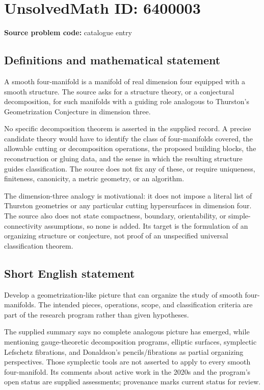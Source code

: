 \documentclass[11pt]{article}
\begin{document}
\section*{UnsolvedMath ID: 6400003}
\textbf{Source problem code:} catalogue entry
\subsection{Definitions and mathematical statement}
A smooth four-manifold is a manifold of real dimension four equipped with a smooth structure. The source asks for a structure theory, or a conjectural decomposition, for such manifolds with a guiding role analogous to Thurston's Geometrization Conjecture in dimension three.

No specific decomposition theorem is asserted in the supplied record. A precise candidate theory would have to identify the class of four-manifolds covered, the allowable cutting or decomposition operations, the proposed building blocks, the reconstruction or gluing data, and the sense in which the resulting structure guides classification. The source does not fix any of these, or require uniqueness, finiteness, canonicity, a metric geometry, or an algorithm.

The dimension-three analogy is motivational: it does not impose a literal list of Thurston geometries or any particular cutting hypersurfaces in dimension four. The source also does not state compactness, boundary, orientability, or simple-connectivity assumptions, so none is added. Its target is the formulation of an organizing structure or conjecture, not proof of an unspecified universal classification theorem.
\subsection{Short English statement}
Develop a geometrization-like picture that can organize the study of smooth four-manifolds. The intended pieces, operations, scope, and classification criteria are part of the research program rather than given hypotheses.

The supplied summary says no complete analogous picture has emerged, while mentioning gauge-theoretic decomposition programs, elliptic surfaces, symplectic Lefschetz fibrations, and Donaldson's pencils/fibrations as partial organizing perspectives. Those symplectic tools are not asserted to apply to every smooth four-manifold. Its comments about active work in the 2020s and the program's open status are supplied assessments; provenance marks current status for review.
\end{document}
